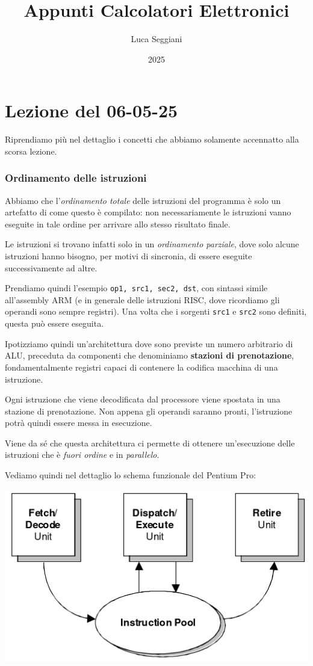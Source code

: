 \documentclass[a4paper,11pt]{article}
\title{Appunti Calcolatori Elettronici}
\author{Luca Seggiani}
\date{2025}
\begin{document}
\section{Lezione del 06-05-25}

\thispagestyle{empty}
\pagestyle{fancy}

Riprendiamo più nel dettaglio i concetti che abbiamo solamente accennatto alla scorsa lezione.

\subsubsection{Ordinamento delle istruzioni}
Abbiamo che l'\textit{ordinamento totale} delle istruzioni del programma è solo un artefatto di come questo è compilato: non necessariamente le istruzioni vanno eseguite in tale ordine per arrivare allo stesso risultato finale.

Le istruzioni si trovano infatti solo in un \textit{ordinamento parziale}, dove solo alcune istruzioni hanno bisogno, per motivi di sincronia, di essere eseguite successivamente ad altre.

Prendiamo quindi l'esempio \lstinline|op1, src1, sec2, dst|, con sintassi simile all'assembly ARM (e in generale delle istruzioni RISC, dove ricordiamo gli operandi sono sempre registri). 
Una volta che i sorgenti \lstinline|src1| e \lstinline|src2| sono definiti, questa può essere eseguita.

Ipotizziamo quindi un'architettura dove sono previste un numero arbitrario di ALU, preceduta da componenti che denominiamo \textbf{stazioni di prenotazione}, fondamentalmente registri capaci di contenere la codifica macchina di una istruzione.

Ogni istruzione che viene decodificata dal processore viene spostata in una stazione di prenotazione. 
Non appena gli operandi saranno pronti, l'istruzione potrà quindi essere messa in esecuzione.

Viene da sé che questa architettura ci permette di ottenere un'esecuzione delle istruzioni che è \textit{fuori ordine} e in \textit{parallelo}.

\par\smallskip

Vediamo quindi nel dettaglio lo schema funzionale del Pentium Pro:
\begin{center}
	\includegraphics[scale=.33]{../figures/ppro_hilevel.png}
\end{center}
\end{document}
